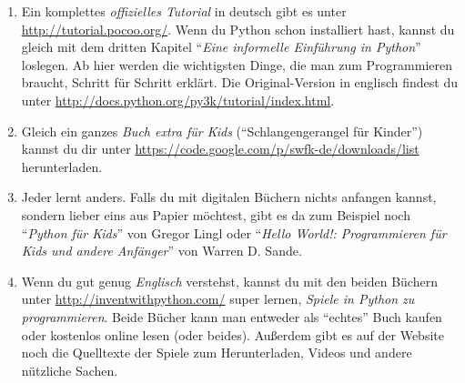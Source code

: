 	\begin{enumerate}
		\item Ein komplettes \emph{offizielles Tutorial} in deutsch gibt es unter \url{http://tutorial.pocoo.org/}. Wenn du Python schon installiert hast, kannst du gleich mit dem dritten Kapitel \enquote{\emph{Eine informelle Einführung in Python}} loslegen. Ab hier werden die wichtigsten Dinge, die man zum Programmieren braucht, Schritt für Schritt erklärt. Die Original-Version in englisch findest du unter \url{http://docs.python.org/py3k/tutorial/index.html}.
		
		\item Gleich ein ganzes \emph{Buch extra für Kids} (\enquote{Schlangengerangel für
Kinder}) kannst du dir unter \url{https://code.google.com/p/swfk-de/downloads/list} herunterladen.
		
		\item Jeder lernt anders. Falls du mit digitalen Büchern nichts anfangen kannst, sondern lieber eins aus Papier möchtest, gibt es da zum Beispiel noch \enquote{\emph{Python für Kids}} von Gregor Lingl oder \enquote{\emph{Hello World!: Programmieren für Kids und andere Anfänger}} von Warren D. Sande.
		
		\item Wenn du gut genug \emph{Englisch} verstehst, kannst du mit den beiden Büchern unter \url{http://inventwithpython.com/} super lernen, \emph{Spiele in Python zu programmieren}. Beide Bücher kann man entweder als \enquote{echtes} Buch kaufen oder kostenlos online lesen (oder beides). Außerdem gibt es auf der Website noch die Quelltexte der Spiele zum Herunterladen, Videos und andere nützliche Sachen.
		
	\end{enumerate}
	
	
